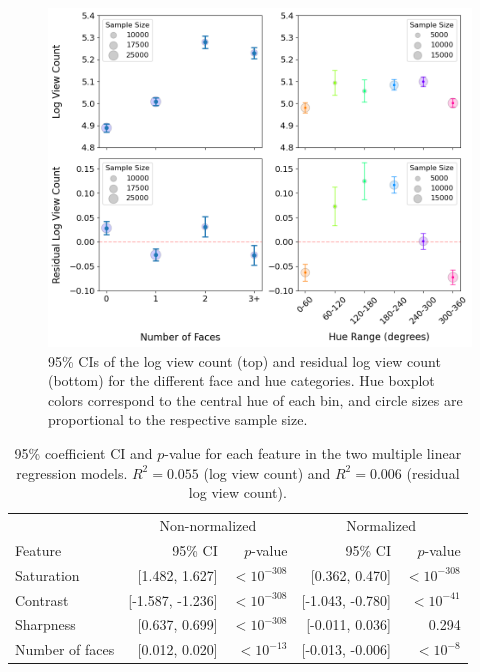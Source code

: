 \documentclass{article}
\begin{document}
\begin{figure}[h]
  \begin{minipage}[t]{0.67\textwidth}
    \vspace{0pt}  %
    \includegraphics[width=\textwidth]{figs/faces-and-hue.png}
  \end{minipage}%
  \hspace{0.05\textwidth}%
  \begin{minipage}[t]{0.28\textwidth}
    \vspace{0pt}  %
    \caption{95\% CIs of the log view count (top) and residual log view count (bottom) for the different face and hue categories. Hue boxplot colors correspond to the central hue of each bin, and circle sizes are proportional to the respective sample size.}
    \label{fig:faces-and-hue}
  \end{minipage}
\end{figure}

\begin{table}[h]
\centering
\begin{tabular}{lrrrr}
\toprule
& \multicolumn{2}{c}{Non-normalized} & \multicolumn{2}{c}{Normalized} \\
\cmidrule(lr){2-3} \cmidrule(lr){4-5}
Feature & 95\% CI & $p$-value & 95\% CI & $p$-value \\
\midrule
Saturation & [1.482, 1.627] & $<10^{-308}$ & [0.362, 0.470] & $<10^{-308}$ \\

Contrast & [-1.587, -1.236] & $<10^{-308}$ & [-1.043, -0.780] & $<10^{-41}$ \\
Sharpness & [0.637, 0.699] & $<10^{-308}$ & [-0.011, 0.036] & 0.294 \\
Number of faces & [0.012, 0.020] & $<10^{-13}$ & [-0.013, -0.006] & $<10^{-8}$ \\
\bottomrule
\end{tabular}
\vspace{\baselineskip}
\caption{95\% coefficient CI and $p$-value for each feature in the two multiple linear regression models. $R^2 = 0.055$ (log view count) and $R^2 = 0.006$ (residual log view count).}
\label{tab:regression}
\end{table}
\end{document}
